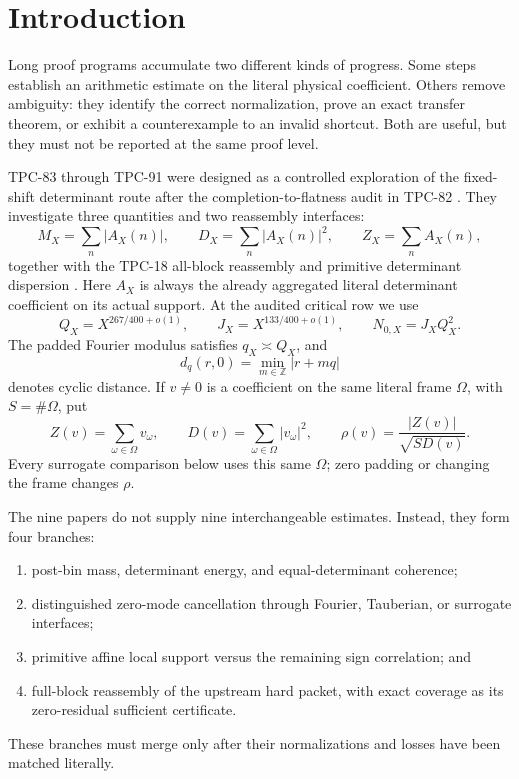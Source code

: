 \section{Introduction}
\label{sec:introduction}

Long proof programs accumulate two different kinds of progress.
Some steps establish an arithmetic estimate on the literal physical
coefficient.  Others remove ambiguity: they identify the correct
normalization, prove an exact transfer theorem, or exhibit a
counterexample to an invalid shortcut.  Both are useful, but they
must not be reported at the same proof level.

TPC-83 through TPC-91 were designed as a controlled exploration of
the fixed-shift determinant route after the completion-to-flatness
audit in TPC-82 \citep{WangTPC82}.  They investigate three quantities
and two reassembly interfaces:
\[
 M_X=\sum_n|A_X(n)|,\qquad
 D_X=\sum_n|A_X(n)|^2,\qquad
 Z_X=\sum_nA_X(n),
\]
together with the TPC-18 all-block reassembly and primitive determinant
dispersion \citep{WangTPC18}.  Here \(A_X\) is always the already
aggregated literal determinant coefficient on its actual support.
At the audited critical row we use
\[
 Q_X=X^{267/400+o(1)},\qquad
 J_X=X^{133/400+o(1)},\qquad
 N_{0,X}=J_XQ_X^2.
\]
The padded Fourier modulus satisfies \(q_X\asymp Q_X\), and
\[
 d_q(r,0)=\min_{m\in\mathbb Z}|r+mq|
\]
denotes cyclic distance.  If \(v\ne0\) is a coefficient on the same
literal frame \(\Omega\), with \(S=\#\Omega\), put
\[
 Z(v)=\sum_{\omega\in\Omega}v_\omega,\qquad
 D(v)=\sum_{\omega\in\Omega}|v_\omega|^2,\qquad
 \rho(v)=\frac{|Z(v)|}{\sqrt{S D(v)}}.
\]
Every surrogate comparison below uses this same \(\Omega\); zero
padding or changing the frame changes \(\rho\).

The nine papers do not supply nine interchangeable estimates.
Instead, they form four branches:
\begin{enumerate}[label=(\roman*),leftmargin=2.2em]
\item post-bin mass, determinant energy, and equal-determinant
  coherence;
\item distinguished zero-mode cancellation through Fourier,
  Tauberian, or surrogate interfaces;
\item primitive affine local support versus the remaining sign
  correlation; and
\item full-block reassembly of the upstream hard packet, with exact
  coverage as its zero-residual sufficient certificate.
\end{enumerate}
These branches must merge only after their normalizations and losses
have been matched literally.

